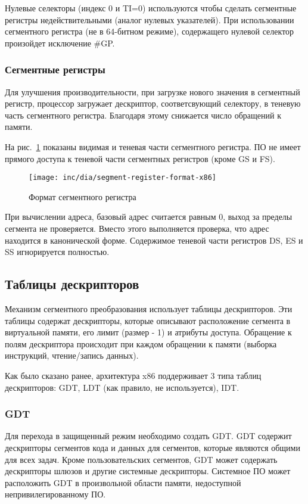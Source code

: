 Нулевые селекторы (индекс 0 и TI=0) используются чтобы сделать сегментные
регистры недействительными (аналог нулевых указателей).
При использовании сегментного регистра (не в 64-битном режиме),
содержащего нулевой селектор произойдет исключение \#GP.

\subsubsection*{Сегментные регистры}
Для улучшения производительности, при загрузке нового значения в сегментный регистр,
процессор загружает дескриптор, соответсвующий селектору, в теневую часть сегментного регистра.
Благодаря этому снижается число обращений к памяти.

На рис.~\ref{fig:segment-register-format-x86} показаны видимая и теневая части сегментного регистра.
ПО не имеет прямого доступа к теневой части сегментных регистров (кроме GS и FS).

\begin{figure}[ht!]
  \centering
  \texttt{[image: inc/dia/segment-register-format-x86]}
  \caption{Формат сегментного регистра}
  \label{fig:segment-register-format-x86}
\end{figure}

При вычислении адреса, базовый адрес считается равным 0, выход за пределы сегмента не проверяется.
Вместо этого выполняется проверка, что адрес находится в канонической форме. Содержимое теневой части
регистров DS, ES и SS игнорируется полностью.

\subsection{Таблицы дескрипторов}
Механизм сегментного преобразования использует таблицы дескрипторов.
Эти таблицы содержат дескрипторы, которые описывают расположение сегмента в виртуальной памяти,
его лимит (размер - 1) и атрибуты доступа. Обращение к полям дескриптора происходит при каждом
обращении к памяти (выборка инструкций, чтение/запись данных).

Как было сказано ранее, архитектура x86 поддерживает 3 типа таблиц дескрипторов: GDT, LDT (как правило, не используется), IDT.

\subsubsection*{GDT}
Для перехода в защищенный режим необходимо создать GDT. GDT содержит дескрипторы
сегментов кода и данных для сегментов, которые являются общими для всех задач.
Кроме пользовательских сегментов, GDT может содержать дескрипторы шлюзов и
другие системные дескрипторы. Системное ПО может расположить GDT в произвольной
области памяти, недоступной непривилегированному ПО.

